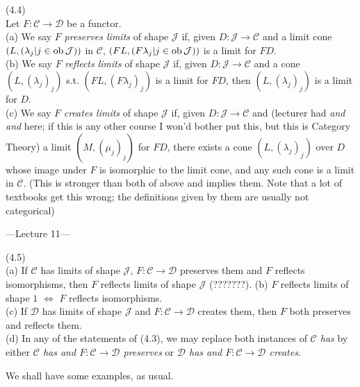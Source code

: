 \documentclass[a4paper]{article}
\begin{document}
\begin{defi} (4.4)\\
    Let $F: \mathcal{C} \to \mathcal{D}$ be a functor.\\
    (a) We say $F$ \emph{preserves limits} of shape $\mathcal{J}$ if, given $D:\mathcal{J} \to \mathcal{C}$ and a limit cone $(L,(\lambda_j|j \in \operatorname{ob}\mathcal{J}))$ in $\mathcal{C}$, $(FL, (F\lambda_j | j \in \operatorname{ob} \mathcal{J}))$ is a limit for $FD$.\\
    (b) We say $F$ \emph{reflects limits} of shape $\mathcal{J}$ if, given $D:\mathcal{J} \to \mathcal{C}$ and a cone $(L,(\lambda_j)_j)$ s.t. $(FL,(F\lambda_j)_j)$ is a limit for $FD$, then $(L,(\lambda_j)_j)$ is a limit for $D$.\\
    (c) We say $F$ \emph{creates limits} of shape $\mathcal{J}$ if, given $D : \mathcal{J} \to \mathcal{C}$ and (lecturer had \emph{and and} here; if this is any other course I won'd bother put this, but this is Category Theory) a limit $(M,(\mu_j)_j)$ for $FD$, there exists a cone $(L,(\lambda_j)_j)$ over $D$ whose image under $F$ is isomorphic to the limit cone, and any such cone is a limit in $\mathcal{C}$. (This is stronger than both of above and implies them. Note that a lot of textbooks get this wrong; the definitions given by them are usually not categorical)
\end{defi}

---Lecture 11---

\begin{rem} (4.5)\\
    (a) If $\mathcal{C}$ has limits of shape $\mathcal{J}$, $F: \mathcal{C} \to \mathcal{D}$ preserves them and $F$ reflects isomorphisms, then $F$ reflects limits of shape $\mathcal{J}$ (???????).
    (b) $F$ reflects limits of shape $1$ $\iff$ $F$ reflects isomorphisms.\\
    (c) If $\mathcal{D}$ has limits of shape $\mathcal{J}$ and $F:\mathcal{C} \to \mathcal{D}$ creates them, then $F$ both preserves and reflects them.\\
    (d) In any of the statements of (4.3), we may replace both instances of \emph{$\mathcal{C}$ has} by either \emph{$\mathcal{C}$ has and $F:\mathcal{C} \to \mathcal{D}$ preserves} or \emph{$\mathcal{D}$ has and $F:\mathcal{C} \to \mathcal{D}$ creates}.
\end{rem}

We shall have some examples, as usual.
\end{document}
